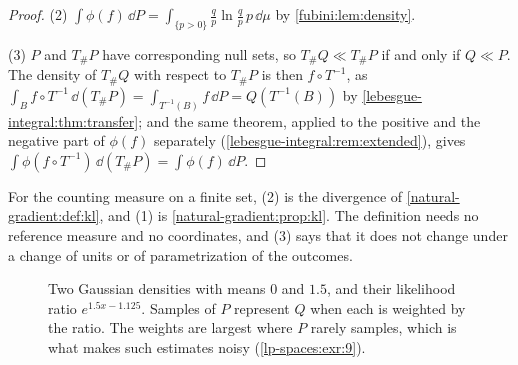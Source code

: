 \begin{notechapter}
\begin{proof}
(2) $\int\phi(f)\,\dd P = \int_{\{p > 0\}}\frac qp\ln\frac qp\,p\,\dd\mu$
by \cref{fubini:lem:density}.

(3) $P$ and $T_\#P$ have corresponding null sets, so
$T_\#Q\ll T_\#P$ if and only if $Q\ll P$. The density of $T_\#Q$ with
respect to $T_\#P$ is then $f\circ T^{-1}$, as
$\int_Bf\circ T^{-1}\,\dd(T_\#P) = \int_{T^{-1}(B)}f\,\dd P
= Q(T^{-1}(B))$ by \cref{lebesgue-integral:thm:transfer}; and the same
theorem, applied to the positive and the negative part of $\phi(f)$
separately (\cref{lebesgue-integral:rem:extended}), gives
$\int\phi(f\circ T^{-1})\,\dd(T_\#P) = \int\phi(f)\,\dd P$.
\end{proof}

For the counting measure on a finite set, (2) is the divergence of
\cref{natural-gradient:def:kl}, and (1) is
\cref{natural-gradient:prop:kl}. The definition needs no reference
measure and no coordinates, and (3) says that it does not change under
a change of units or of parametrization of the outcomes.

\begin{figure}[ht]
\centering
{}
\caption{Two Gaussian densities with means $0$ and $1.5$, and their
likelihood ratio $e^{1.5x - 1.125}$. Samples of $P$ represent $Q$ when
each is weighted by the ratio. The weights are largest where $P$ rarely
samples, which is what makes such estimates noisy
(\cref{lp-spaces:exr:9}).}
\label{lp-spaces:fig:ratio}
\end{figure}


\end{notechapter}
